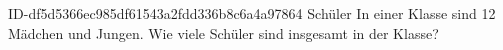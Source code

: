 \begin{exercise}
      {ID-df5d5366ec985df61543a2fdd336b8c6a4a97864}
      {Schüler}
  \ifproblem\problem
    In einer Klasse sind 12 Mädchen und  Jungen. Wie viele Schüler sind
    insgesamt in der Klasse?
  \fi
\end{exercise}
